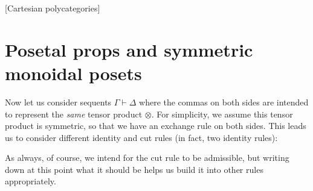 \documentclass{book}
\let\types\vdash
\let\tensor\otimes
\begin{document}
[Cartesian polycategories]


\section{Posetal props and symmetric monoidal posets}
\label{sec:proppos-smpos}

Now let us consider sequents $\Gamma\types\Delta$ where the commas on both sides are intended to represent the \emph{same} tensor product $\tensor$.
For simplicity, we assume this tensor product is symmetric, so that we have an exchange rule on both sides.
This leads us to consider different identity and cut rules (in fact, two identity rules):
As always, of course, we intend for the cut rule to be admissible, but writing down at this point what it should be helps us build it into other rules appropriately.
\end{document}
